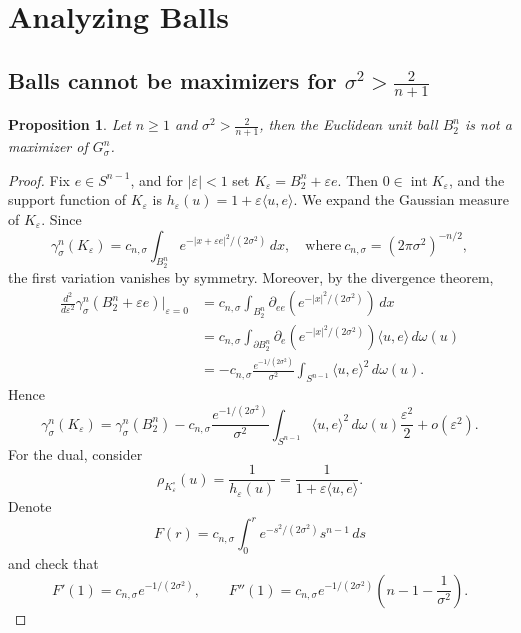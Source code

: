 \documentclass[12pt,oneside,reqno]{amsart}
\numberwithin{equation}{section}
\newtheorem{proposition}[theorem]{Proposition}
\theoremstyle{remark}
\newcommand{\eps}{\varepsilon}
\begin{document}
\section{Analyzing Balls}

\subsection{Balls cannot be maximizers for $\sigma^2> {\frac{2}{n+1}}$}
\begin{proposition}
Let $n\ge 1$ and $\sigma^2>{\frac{2}{n+1}}$, then the Euclidean unit ball \(B_2^n\) is not a maximizer of $G^n_\sigma$. 
\end{proposition}

\begin{proof}
Fix \(e\in S^{n-1}\), and for \(|\eps|<1\) set
$K_\eps=B_2^n+\eps e$. 
Then \(0\in \operatorname{int}K_\eps\), and the support function of
\(K_\eps\) is $h_\eps(u)=1+\eps\langle u,e\rangle$. 
We expand the Gaussian measure of \(K_\eps\). Since
\[
        \gamma_\sigma^n(K_\eps)
        =
        c_{n,\sigma} \int_{B_2^n}
        e^{-|x+\eps e|^2/(2\sigma^2)}\,dx ,\quad \text{where} \ c_{n,\sigma}=(2\pi\sigma^2)^{-n/2},
\]
the first variation vanishes by symmetry. Moreover, by the divergence theorem, 
\[
\begin{aligned}
        \frac{d^2}{d\eps^2}
        \gamma_\sigma^n(B_2^n+\eps e)\bigg|_{\eps=0}
        &=
        c_{n,\sigma} \int_{B_2^n}\partial_{ee}
        \left(
        e^{-|x|^2/(2\sigma^2)}\right)\,dx  \\
        &=
        c_{n,\sigma}\int_{\partial B_2^n}
        \partial_e
        \left(
        e^{-|x|^2/(2\sigma^2)}\right)
        \langle u,e\rangle\,d\omega(u)  \\
        &=
        -c_{n,\sigma}\frac{e^{-1/(2\sigma^2)}}{\sigma^2}
        \int_{  S^{n-1}}\langle u,e\rangle^2\,d\omega(u).
\end{aligned}
\]
Hence
\[
        \gamma_\sigma^n(K_\eps)
        =
        \gamma_\sigma^n(B_2^n)
        -
        c_{n,\sigma}\frac{e^{-1/(2\sigma^2)}}{\sigma^2}
        \int_{  S^{n-1}}\langle u,e\rangle^2\,d\omega(u)\frac{\eps^2}{2}
        +
        o(\eps^2).
\]
For the dual, consider 
\[
        \rho_{K_\eps^\circ}(u)=\frac1{h_\eps(u)}
        =
        \frac1{1+\eps\langle u,e\rangle}.
\]
Denote
\[
        F(r)
        =
        c_{n,\sigma}
        \int_0^r e^{-s^2/(2\sigma^2)}s^{n-1}\,ds  
\]
and check that 
\[
        F'(1)=c_{n,\sigma}e^{-1/(2\sigma^2)},
        \qquad
        F''(1)=c_{n,\sigma}e^{-1/(2\sigma^2)}\left(n-1-\frac1{\sigma^2}\right). 
\]


\end{proof}
\end{document}
